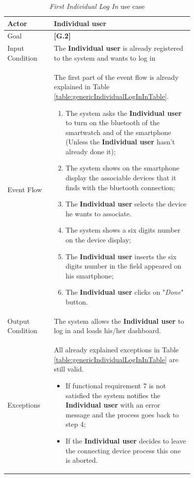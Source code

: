 \begin{center}
\begin{table}
\begin{tabular}{ | l | p{0.75\linewidth} | }
  \hline
    Actor & \textbf{Individual user} \\ \hline
    Goal & \textbf{[G.2]} \\ \hline
    Input Condition & The \textbf{Individual user} is already registered to the system and wants to log in \\ \hline
    Event Flow & \begin{minipage}[t]{0.7\textwidth}
      The first part of the event flow is already explained in Table \ref{table:genericIndividualLogInInTable}.
      \smallskip
      \begin{enumerate}
        \item The system asks the \textbf{Individual user} to turn on the bluetooth of the smartwatch and of the smartphone (Unless the \textbf{Individual user} hasn't already done it);
        \item The system shows on the smartphone display the associable devices that it finds with the bluetooth connection;
        \item The \textbf{Individual user} selects the device he wants to associate.
        \item The system shows a six digits number on the device display;
        \item The \textbf{Individual user} inserts the six digits number in the field appeared on his smartphone;
        \item The \textbf{Individual user} clicks on "\textit{Done}" button.
      \end{enumerate}
    \smallskip
  \end{minipage} \\ \hline
  Output Condition & The system allows the \textbf{Individual user} to log in and loads his/her dashboard. \\ \hline
  Exceptions & \begin{minipage}[t]{0.7\textwidth}
    All already explained exceptions in Table \ref{table:genericIndividualLogInInTable} are still valid.
    \begin{itemize}
      \smallskip
      \item If functional requirement 7 is not satisfied the system notifies the \textbf{Individual user} with an error message and the process goes back to step 4;
      \item If the \textbf{Individual user} decides to leave the connecting device process this one is aborted.
    \end{itemize}
    \smallskip
  \end{minipage}  \\ \hline
\end{tabular}
\caption{\textit{First Individual Log In} use case}
\label{table:firstIndividualLogInInTable}
\end{table}
\end{center}

